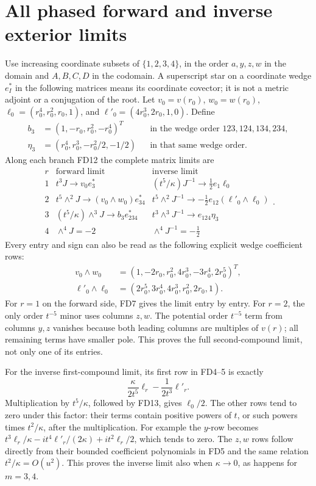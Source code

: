 \documentclass[11pt]{article}
\begin{document}
\section{All phased forward and inverse exterior limits}
Use increasing coordinate subsets of \(\{1,2,3,4\}\), in
the order \(a,y,z,w\) in the domain and \(A,B,C,D\) in the
codomain. A superscript star on a coordinate wedge \(e_I^*\)
in the following matrices means its coordinate covector;
it is not a metric adjoint or a conjugation of the root.
Let \(v_0=v(r_0)\), \(w_0=w(r_0)\),
\(\ell_0=(r_0^4,r_0^2,r_0,1)\), and
\(\ell'_0=(4r_0^3,2r_0,1,0)\). Define
\[
\begin{aligned}
 b_3&=(1,-r_0,r_0^2,-r_0^4)^T
       &&\text{in the wedge order }123,124,134,234,\\
 \eta_3&=(r_0^4,r_0^3,-r_0^2/2,-1/2)
       &&\text{in that same wedge order}.
\end{aligned}
\]
Along each branch FD12 the complete matrix limits are
\[
\boxed{\begin{array}{c|c|c}
 r&\text{forward limit}&\text{inverse limit}\\\hline
 1&t^3J\longrightarrow v_0e_3^*
       &(t^5/\kappa)J^{-1}\longrightarrow\tfrac12e_1\ell_0\\
 2&t^5\wedge^2J\longrightarrow(v_0\wedge w_0)e_{34}^*
       &t^5\wedge^2J^{-1}\longrightarrow
                    -\tfrac12e_{12}(\ell'_0\wedge\ell_0)\\
 3&(t^5/\kappa)\wedge^3J\longrightarrow b_3e_{234}^*
       &t^3\wedge^3J^{-1}\longrightarrow e_{124}\eta_3\\
 4&\wedge^4J=-2&\wedge^4J^{-1}=-\tfrac12
\end{array}.}\tag{FD14}
\]
Every entry and sign can also be read as the following
explicit wedge coefficient rows:
\[
\begin{aligned}
 v_0\wedge w_0&=(1,-2r_0,r_0^2,4r_0^3,-3r_0^4,2r_0^5)^T,\\
 \ell'_0\wedge\ell_0&=(2r_0^5,3r_0^4,4r_0^3,r_0^2,2r_0,1).
\end{aligned}\tag{FD15}
\]
For \(r=1\) on the forward side, FD7 gives the limit
entry by entry. For \(r=2\), the only order \(t^{-5}\)
minor uses columns \(z,w\). The potential order \(t^{-5}\)
term from columns \(y,z\) vanishes because both leading
columns are multiples of \(v(r)\); all remaining terms
have smaller pole. This proves the full second-compound
limit, not only one of its entries.

For the inverse first-compound limit, its first row in
FD4--5 is exactly
\[
 \frac{\kappa}{2t^5}\ell_r-\frac1{2t^3}\ell'_r.
 \tag{FD16}
\]
Multiplication by \(t^5/\kappa\), followed by FD13,
gives \(\ell_0/2\). The other rows tend to zero under
this factor: their terms contain positive powers of \(t\),
or such powers times \(t^2/\kappa\), after the multiplication.
For example the \(y\)-row becomes
\(t^3\ell_r/\kappa-it^4\ell'_r/(2\kappa)
+i t^2\ell_r/2\), which tends to zero. The \(z,w\)
rows follow directly from their bounded coefficient
polynomials in FD5 and the same relation
\(t^2/\kappa=O(u^2)\). This proves the inverse limit
also when \(\kappa\to0\), as happens for \(m=3,4\).
\end{document}
